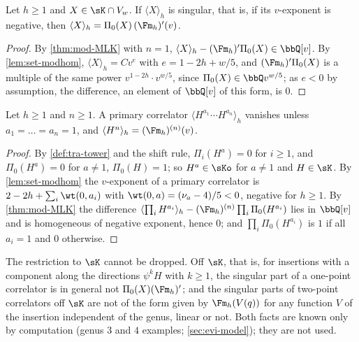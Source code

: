 \begin{cor}
\label{cor:mod-onepoint}
Let $h\geq 1$ and $X\in\sK\cap V_w$. If $\langle X\rangle_h$ is singular, that is, if its $v$-exponent is negative, then $\langle X\rangle_h=\Pi_0(X)\,(\Fm_h)'(v)$.
\end{cor}

\begin{proof}
By \cref{thm:mod-MLK} with $n=1$, $\langle X\rangle_h-(\Fm_h)'\Pi_0(X)\in\bbQ[v]$. By \cref{lem:set-modhom}, $\langle X\rangle_h=Cv^e$ with $e=1-2h+w/5$, and $(\Fm_h)'\Pi_0(X)$ is a multiple of the same power $v^{1-2h}\cdot v^{w/5}$, since $\Pi_0(X)\in\bbQ v^{w/5}$; as $e<0$ by assumption, the difference, an element of $\bbQ[v]$ of this form, is $0$.
\end{proof}

\begin{cor}
\label{cor:mod-primary}
Let $h\geq 1$ and $n\geq 1$. A primary correlator $\langle H^{a_1}\cdots H^{a_n}\rangle_h$ vanishes unless $a_1=\dots=a_n=1$, and $\langle H^n\rangle_h=(\Fm_h)^{(n)}(v)$.
\end{cor}

\begin{proof}
By \cref{def:tra-tower} and the shift rule, $\Pi_i(H^a)=0$ for $i\geq 1$, and $\Pi_0(H^a)=0$ for $a\neq 1$, $\Pi_0(H)=1$; so $H^a\in\sKo$ for $a\neq 1$ and $H\in\sK$. By \cref{lem:set-modhom} the $v$-exponent of a primary correlator is $2-2h+\sum_i\wt(0,a_i)$ with $\wt(0,a)=(\nu_a-4)/5<0$, negative for $h\geq 1$. By \cref{thm:mod-MLK} the difference $\langle\prod_iH^{a_i}\rangle_h-(\Fm_h)^{(n)}\prod_i\Pi_0(H^{a_i})$ lies in $\bbQ[v]$ and is homogeneous of negative exponent, hence $0$; and $\prod_i\Pi_0(H^{a_i})$ is $1$ if all $a_i=1$ and $0$ otherwise.
\end{proof}

\begin{rmk}[Off $\sK$]
\label{rmk:mod-offK}
The restriction to $\sK$ cannot be dropped. Off $\sK$, that is, for insertions with a component along the directions $\psi^kH$ with $k\geq 1$, the singular part of a one-point correlator is in general not $\Pi_0(X)(\Fm_h)'$; and the singular parts of two-point correlators off $\sK$ are not of the form given by $\Fm_h(V(q))$ for any function $V$ of the insertion independent of the genus, linear or not. Both facts are known only by computation (genus $3$ and $4$ examples; \cref{sec:evi-model}); they are not used.
\end{rmk}

